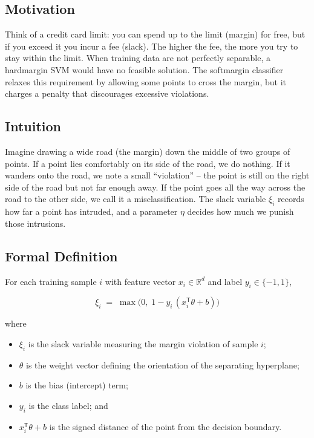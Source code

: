 \documentclass[12pt, a4paper]{article}
\begin{document}
\subsection{Motivation}  
Think of a credit card limit: you can spend up to the limit (margin) for free, but if you exceed it you incur a fee (slack). The higher the fee, the more you try to stay within the limit.  
When training data are not perfectly separable, a hardmargin SVM would have no feasible solution.  
The softmargin classifier relaxes this requirement by allowing some points to cross the margin, but it charges a penalty that discourages excessive violations.

\subsection{Intuition}  
Imagine drawing a wide road (the margin) down the middle of two groups of points.  
If a point lies comfortably on its side of the road, we do nothing.  
If it wanders onto the road, we note a small ``violation'' -- the point is still on the right side of the road but not far enough away.  
If the point goes all the way across the road to the other side, we call it a misclassification.  
The slack variable \(\xi_i\) records how far a point has intruded, and a parameter \(\eta\) decides how much we punish those intrusions.

\subsection{Formal Definition}  
For each training sample \(i\) with feature vector \(x_i\in\mathbb{R}^d\) and label \(y_i\in\{-1,1\}\),

\[
\boxed{\;\xi_i \;=\; \max\!\bigl(0,\;1 - y_i\,(x_i^{\mathsf T}\theta + b)\bigr)\;}
\]

where  

\begin{itemize}
\item \(\xi_i\) is the slack variable measuring the margin violation of sample \(i\);  
\item \(\theta\) is the weight vector defining the orientation of the separating hyperplane;  
\item \(b\) is the bias (intercept) term;  
\item \(y_i\) is the class label; and  
\item \(x_i^{\mathsf T}\theta + b\) is the signed distance of the point from the decision boundary.
\end{itemize}
\end{document}
